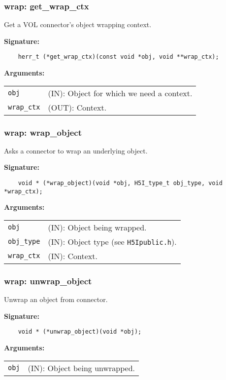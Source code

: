\subsubsection{wrap: get\_wrap\_ctx}
Get a VOL connector's object wrapping context.

\begin{mdframed}[style=bgbox]
\textbf{Signature:}
\begin{lstlisting}
    herr_t (*get_wrap_ctx)(const void *obj, void **wrap_ctx);
\end{lstlisting}

\textbf{Arguments:}\\
\begin{tabular}{l p{13.5cm}}
  \texttt{obj} & (IN): Object for which we need a context.\\
  \texttt{wrap\_ctx} & (OUT): Context.\\
\end{tabular}
\end{mdframed}

\subsubsection{wrap: wrap\_object}
Asks a connector to wrap an underlying object.

\begin{mdframed}[style=bgbox]
\textbf{Signature:}
\begin{lstlisting}
    void * (*wrap_object)(void *obj, H5I_type_t obj_type, void *wrap_ctx);
\end{lstlisting}

\textbf{Arguments:}\\
\begin{tabular}{l p{13.5cm}}
  \texttt{obj} & (IN): Object being wrapped.\\
  \texttt{obj\_type} & (IN): Object type (see \texttt{H5Ipublic.h}).\\
  \texttt{wrap\_ctx} & (IN): Context.\\
\end{tabular}
\end{mdframed}

\subsubsection{wrap: unwrap\_object}
Unwrap an object from connector.

\begin{mdframed}[style=bgbox]
\textbf{Signature:}
\begin{lstlisting}
    void * (*unwrap_object)(void *obj);
\end{lstlisting}

\textbf{Arguments:}\\
\begin{tabular}{l p{13.5cm}}
  \texttt{obj} & (IN): Object being unwrapped.\\
\end{tabular}
\end{mdframed}


